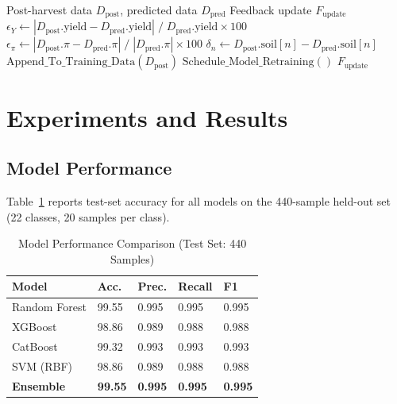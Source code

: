 \documentclass[conference]{IEEEtran}
\begin{document}
\begin{algorithm}[htbp]
\caption{Post-Harvest Feedback Integration}
\label{alg:feedback}
\begin{algorithmic}[1]
\Require Post-harvest data $D_{\mathrm{post}}$, predicted data $D_{\mathrm{pred}}$
\Ensure Feedback update $F_{\mathrm{update}}$
\State $\epsilon_Y \gets |D_{\mathrm{post}}.\mathrm{yield} -
       D_{\mathrm{pred}}.\mathrm{yield}| \;/\; D_{\mathrm{pred}}.\mathrm{yield}
       \times 100$
\State $\epsilon_\pi \gets |D_{\mathrm{post}}.\pi -
       D_{\mathrm{pred}}.\pi| \;/\; |D_{\mathrm{pred}}.\pi| \times 100$
  \State $\delta_n \gets D_{\mathrm{post}}.\mathrm{soil}[n] -
         D_{\mathrm{pred}}.\mathrm{soil}[n]$
\EndFor
\State $\mathrm{Append\_To\_Training\_Data}(D_{\mathrm{post}})$
  \State $\mathrm{Schedule\_Model\_Retraining}()$
\EndIf
\State \Return $F_{\mathrm{update}}$
\end{algorithmic}
\end{algorithm}

\section{Experiments and Results}
\label{sec:results}

\subsection{Model Performance}

Table~\ref{tab:accuracy} reports test-set accuracy for all models on the
440-sample held-out set (22 classes, 20 samples per class).

\begin{table}[htbp]
\caption{Model Performance Comparison (Test Set: 440 Samples)}
\label{tab:accuracy}
\centering
\renewcommand{\arraystretch}{1.1}
\begin{tabular}{p{1.95cm}p{1.35cm}p{1.35cm}p{1.35cm}p{1.15cm}}
\toprule
\textbf{Model} & \textbf{Acc.} & \textbf{Prec.} &
\textbf{Recall} & \textbf{F1} \\
\midrule
Random Forest          & 99.55 & 0.995 & 0.995 & 0.995 \\
XGBoost                & 98.86 & 0.989 & 0.988 & 0.988 \\
CatBoost               & 99.32 & 0.993 & 0.993 & 0.993 \\
SVM (RBF)              & 98.86 & 0.989 & 0.988 & 0.988 \\
\textbf{Ensemble}      & \textbf{99.55} & \textbf{0.995} &
\textbf{0.995} & \textbf{0.995} \\
\bottomrule
\end{tabular}
\end{table}
\end{document}
